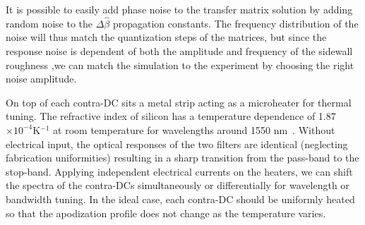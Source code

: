 \documentclass[osajnl,twocolumn,showpacs,superscriptaddress,10pt]{revtex4-1}
\newcommand{\me}{\mathrm{e}}
\begin{document}


%


It is possible to easily add phase noise to the transfer matrix solution by adding random noise to the $\Delta\hat{\beta}$ propagation constants. The frequency distribution of the noise will thus match the quantization steps of the matrices, but since the response noise is dependent of both the amplitude and frequency of the sidewall roughness \cite{simard2011impact},we can match the simulation to the experiment by choosing the right noise amplitude.


On top of each contra-DC sits a metal strip acting as a microheater for thermal tuning.  
The refractive index of silicon has a temperature dependence of 1.87$\times10^{-4}$K$^{-1}$ at room temperature for wavelengths around 1550 nm~\cite{frey2006temperature}.
Without electrical input, the optical responses of the two filters are identical (neglecting fabrication uniformities) resulting in a sharp transition from the pass-band to the stop-band. 
Applying independent electrical currents on the heaters, we can shift the spectra of the contra-DCs simultaneously or differentially for wavelength or bandwidth tuning.
In the ideal case, each contra-DC should be uniformly heated so that the apodization profile does not change as the temperature varies.
\end{document}
